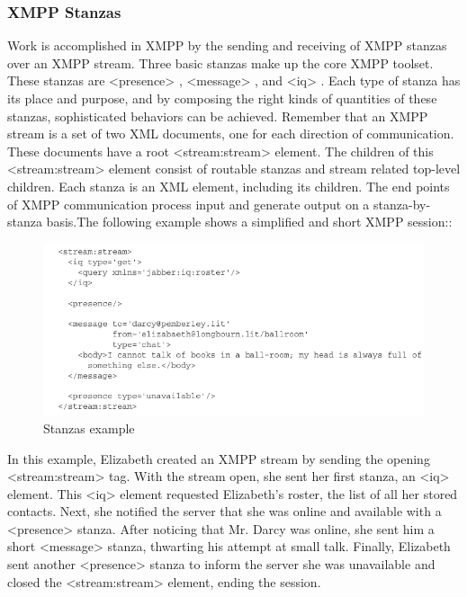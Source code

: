 	\subsubsection{XMPP Stanzas}
	Work is accomplished in XMPP by the sending and receiving of XMPP stanzas over an XMPP stream. Three basic stanzas make up the core XMPP toolset. These stanzas are <presence> , <message> , and <iq> . Each type of stanza has its place and purpose, and by composing the right kinds of quantities of these stanzas, sophisticated behaviors can be achieved. Remember that an XMPP stream is a set of two XML documents, one for each direction of communication. These documents have a root <stream:stream> element. The children of this <stream:stream> element consist of routable stanzas and stream related top-level children. Each stanza is an XML element, including its children. The end points of XMPP communication process input and generate output on a stanza-by-stanza basis.The following example shows a simplified and short XMPP session::
		\begin{figure}[!ht]
		\centering
		\includegraphics[scale=0.9]{images/Stanzas.png}   
		\caption[Stanzas example]{Stanzas example}
		\label{img:interfaces}                           
		\end{figure}
		In this example, Elizabeth created an XMPP stream by sending the opening <stream:stream> tag. With the stream open, she sent her first stanza, an <iq> element. This <iq> element requested Elizabeth’s roster, the list of all her stored contacts. Next, she notified the server that she was online and available with a <presence> stanza. After noticing that Mr. Darcy was online, she sent him a short <message> stanza, thwarting his attempt at small talk. Finally, Elizabeth sent another <presence> stanza to inform the server she was unavailable and closed the <stream:stream> element, ending the session.
    
